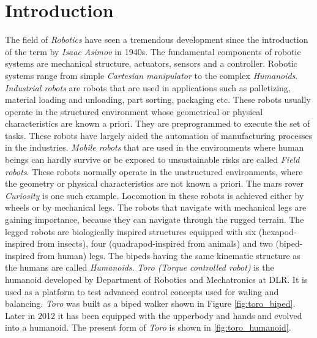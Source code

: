 \chapter{Introduction}
\label{sec:einleitung}
The field of \emph{Robotics} have seen a tremendous development since the introduction of the term by \emph{Isaac Asimov} in 1940s. The fundamental components of robotic systems are mechanical structure, actuators, sensors and a controller. Robotic systems range from simple \emph{Cartesian manipulator} to the complex \emph{Humanoids}. \emph{Industrial robots} are robots that are used in applications such as palletizing, material loading and unloading, part sorting, packaging etc. These robots usually operate in the structured environment whose geometrical or physical characteristics are known a priori. They are preprogrammed to execute the set of tasks. These robots have largely aided the automation of manufacturing processes in the industries. \emph{Mobile robots} that are used in the environments where human beings can hardly survive or be exposed to unsustainable risks are called \emph{Field robots}. These robots normally operate in the unstructured environments, where the geometry or physical characteristics are not known a priori. The mars rover \emph{Curiosity} is one such example. Locomotion in these robots is achieved either by wheels or by mechanical legs. The robots that navigate with mechanical legs are gaining importance, because they can navigate through the rugged terrain. The legged robots are biologically inspired structures equipped with six (hexapod-inspired from insects), four (quadrapod-inspired from animals) and two (biped-inspired from human) legs. The bipeds having the same kinematic structure as the humans are called \emph{Humanoids}. \emph{Toro (Torque controlled robot)} is the humanoid developed by Department of Robotics and Mechatronics at DLR. It is used as a platform to test advanced control concepts used for waling and balancing. \emph{Toro} was built as a biped walker shown in Figure \ref{fig:toro_biped}. Later in 2012 it has been equipped with the upperbody and hands and evolved into a humanoid. The present form of \emph{Toro} is shown in \ref{fig:toro_humanoid}.
